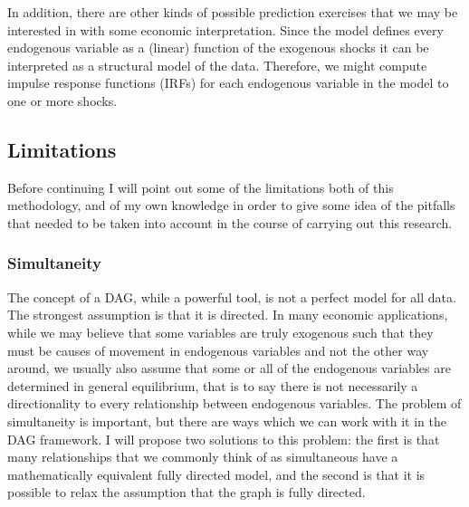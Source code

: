 \documentclass{article}
\begin{document}
In addition, there are other kinds of possible prediction exercises that we may be interested in with some economic interpretation. Since the model defines every endogenous variable as a (linear) function of the exogenous shocks it can be interpreted as a structural model of the data. Therefore, we might compute impulse response functions (IRFs) for each endogenous variable in the model to one or more shocks.

\subsection{Limitations}

Before continuing I will point out some of the limitations both of this methodology, and of my own knowledge in order to give some idea of the pitfalls that needed to be taken into account in the course of carrying out this research.

\subsubsection{Simultaneity}

The concept of a DAG, while a powerful tool, is not a perfect model for all data. The strongest assumption is that it is directed. In many economic applications, while we may believe that some variables are truly exogenous such that they must be causes of movement in endogenous variables and not the other way around, we usually also assume that some or all of the endogenous variables are determined in general equilibrium, that is to say there is not necessarily a directionality to every relationship between endogenous variables. The problem of simultaneity is important, but there are ways which we can work with it in the DAG framework. I will propose two solutions to this problem: the first is that many relationships that we commonly think of as simultaneous have a mathematically equivalent fully directed model, and the second is that it is possible to relax the assumption that the graph is fully directed.
\end{document}
